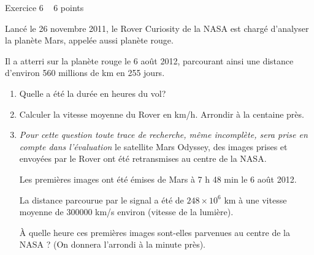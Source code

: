 
%
\begin{h2}Exercice 6   6 points\end{h2}
Lancé le 26 novembre 2011, le Rover Curiosity de la NASA est chargé d'analyser la planète Mars, appelée aussi planète rouge.
\par
Il a atterri sur la planète rouge le 6 août 2012, parcourant ainsi une distance d'environ 560 millions de km en 255 jours.
\begin{enumerate}
     \item
     Quelle a été la durée en heures du vol?
     \item
     Calculer la vitesse moyenne du Rover en km/h. Arrondir à la centaine près.
     \item
     \textit{Pour cette question toute trace de recherche, même incomplète, sera prise en compte dans l'évaluation}
\medskipVia le satellite Mars Odyssey, des images prises et envoyées par le Rover ont été retransmises au centre de la NASA.
     \par
     Les premières images ont été émises de Mars à 7 h 48 min le 6 août 2012.
     \par
     La distance parcourue par le signal a été de $248 \times  10^{6}$ km à une vitesse moyenne de 300000 km/s environ (vitesse de la lumière).
     \par
À quelle heure ces premières images sont-elles parvenues au centre de la NASA ? (On donnera l'arrondi à la minute près).\end{enumerate}

